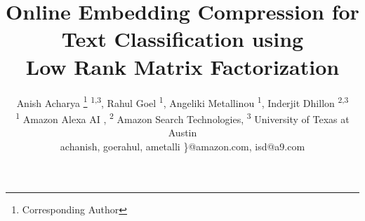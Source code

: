 \documentclass[letterpaper]{article} %
\begin{document}
%
\title{Online Embedding Compression for Text Classification using\\
	  Low Rank Matrix Factorization}
  \author{Anish Acharya \thanks{Corresponding Author} \textsuperscript{1,3}, Rahul Goel \textsuperscript{1}, Angeliki Metallinou \textsuperscript{1}, Inderjit Dhillon \textsuperscript{2,3} \\ \textsuperscript{1} Amazon Alexa AI , \textsuperscript{2} Amazon Search Technologies, \textsuperscript{3} University of Texas at Austin\\  {achanish, goerahul, ametalli \}@amazon.com}, isd@a9.com }
\maketitle
\end{document}
